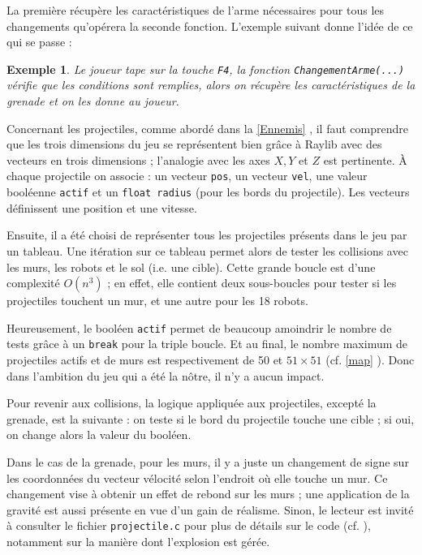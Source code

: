 \documentclass[a4paper,11pt]{article}
\newtheorem{exemple}{Exemple}
\newcommand{\secref}[1]{\autoref{#1} \og \nameref{#1} \fg{}}
\begin{document}
La première récupère les caractéristiques de l'arme nécessaires pour tous les changements qu'opérera la seconde fonction. L'exemple suivant donne l'idée de ce qui se passe :
\begin{exemple}
    Le joueur tape sur la touche \verb|F4|, la fonction \verb|ChangementArme(...)| vérifie que
    les conditions sont remplies, alors on récupère les caractéristiques de la grenade et on les
    donne au joueur.
\end{exemple}

Concernant les projectiles, comme abordé dans la \secref{Ennemis}, il faut comprendre que les trois dimensions du jeu se représentent bien grâce à Raylib avec des vecteurs en trois dimensions ; l'analogie avec les axes $X, Y$ et $Z$ est pertinente. À chaque projectile on associe : un vecteur \verb|pos|, un vecteur \verb|vel|, une valeur booléenne \verb|actif| et un \verb|float radius| (pour les bords du projectile). Les vecteurs définissent une position et une vitesse.

Ensuite, il a été choisi de représenter tous les projectiles présents dans le jeu par un tableau. Une itération sur ce tableau permet alors de tester les collisions avec les murs, les robots et le sol (i.e. une cible). Cette grande boucle est d'une complexité $O(n^3)$ ; en effet, elle contient deux sous-boucles pour tester si les projectiles touchent un mur, et une autre pour les 18 robots. 

Heureusement, le booléen \verb|actif| permet de beaucoup amoindrir le nombre de tests grâce à un \verb|break| pour la triple boucle. Et au final, le nombre maximum de projectiles actifs et de murs est respectivement de 50 et $51 \times 51$ (cf. \secref{map}). Donc dans l'ambition du jeu qui a été la nôtre, il n'y a aucun impact. 

Pour revenir aux collisions, la logique appliquée aux projectiles, excepté la grenade, est la suivante : on teste si le bord du projectile touche une cible ; si oui, on change alors la valeur du booléen.

Dans le cas de la grenade, pour les murs, il y a juste un changement de signe sur les coordonnées du vecteur vélocité selon l'endroit où elle touche un mur. Ce changement vise à obtenir un effet de rebond sur les murs ; une application de la gravité est aussi présente en vue d'un gain de réalisme. Sinon, le lecteur est invité à consulter le fichier \verb|projectile.c| pour plus de détails sur le code (cf. \cite{Github}), notamment sur la manière dont l'explosion est gérée.
\end{document}
